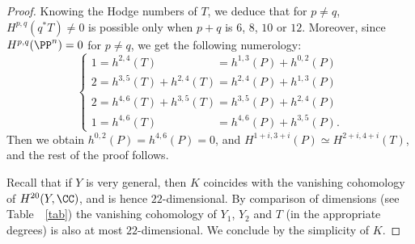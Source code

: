 \begin{proof}
Knowing the Hodge numbers of $T$, we deduce that for $p \neq q$, $H^{p,q}(q^*T)\neq 0$ is possible only when $p+q$ is $6$, $8$, $10$ or $12$. Moreover, since $H^{p,q}(\PP^n)=0$ for $p \neq q$, we get the following numerology:
\[
\begin{cases}
1 = h^{2,4}(T)\phantom{{}+h^{2,4}(T)} = h^{1,3}(P)+h^{0,2}(P)\\
2 = h^{3,5}(T)+h^{2,4}(T) = h^{2,4}(P)+h^{1,3}(P)\\
2 = h^{4,6}(T)+h^{3,5}(T) = h^{3,5}(P)+h^{2,4}(P)\\
1 = h^{4,6}(T)\phantom{{}+h^{2,4}(T)} = h^{4,6}(P)+h^{3,5}(P).
\end{cases}
\]
Then we obtain $h^{0,2}(P)=h^{4,6}(P)=0$, and $H^{1+i,3+i}(P) \simeq H^{2+i,4+i}(T)$, and the rest of the proof follows.

Recall that if $Y$ is very general, then $K$ coincides with the vanishing cohomology of $H^{20}(Y,\CC)$,
and is hence $22$-dimensional. By comparison of dimensions (see Table~ \ref{tab}) the vanishing cohomology
of $Y_1$, $Y_2$ and $T$ (in the appropriate degrees) is also at most $22$-dimensional.
We conclude by the
simplicity of $K$.
\end{proof}

